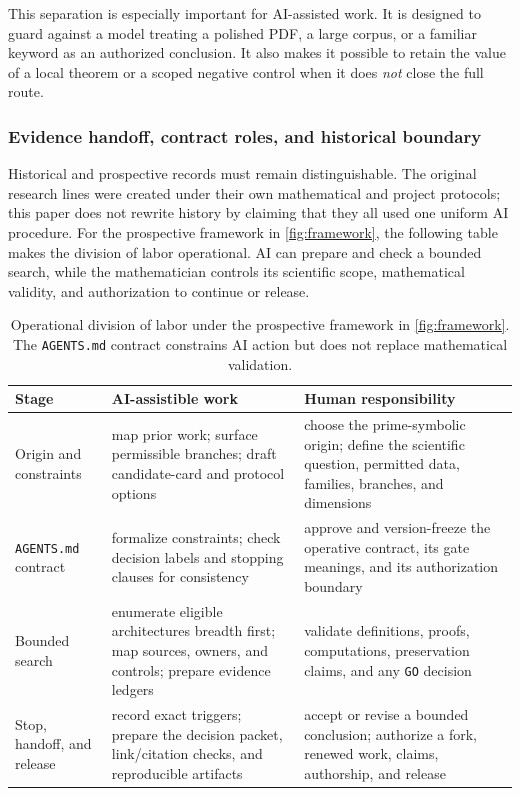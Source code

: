 This separation is especially important for AI-assisted work. It is designed
to guard against a model treating a polished PDF, a large corpus, or a familiar
keyword as an authorized conclusion. It also makes it possible to retain the
value of a local theorem or a scoped negative control when it does \emph{not}
close the full route.


\subsubsection{Evidence handoff, contract roles, and historical boundary}

Historical and prospective records must remain distinguishable. The original
research lines were created under their own mathematical and project protocols;
this paper does not rewrite history by claiming that they all used one uniform
AI procedure. For the prospective framework in \cref{fig:framework}, the
following table makes the division of labor operational. AI can prepare and
check a bounded search, while the mathematician controls its scientific scope,
mathematical validity, and authorization to continue or release.

\begin{table}[H]
\centering
\caption{Operational division of labor under the prospective framework in \cref{fig:framework}. The \texttt{AGENTS.md} contract constrains AI action but does not replace mathematical validation.}
\label{tab:roles}
\small
\begin{tabularx}{\linewidth}{@{}p{.22\linewidth}YY@{}}
\toprule
\textbf{Stage} & \textbf{AI-assistible work} & \textbf{Human responsibility} \\
\midrule
Origin and constraints & map prior work; surface permissible branches; draft
candidate-card and protocol options & choose the prime-symbolic origin; define
the scientific question, permitted data, families, branches, and dimensions \\
\texttt{AGENTS.md} contract & formalize constraints; check decision labels and
stopping clauses for consistency & approve and version-freeze the operative
contract, its gate meanings, and its authorization boundary \\
Bounded search & enumerate eligible architectures breadth first; map sources,
owners, and controls; prepare evidence ledgers & validate definitions, proofs,
computations, preservation claims, and any \texttt{GO} decision \\
Stop, handoff, and release & record exact triggers; prepare the decision packet,
link/citation checks, and reproducible artifacts & accept or revise a bounded
conclusion; authorize a fork, renewed work, claims, authorship, and release \\
\bottomrule
\end{tabularx}
\end{table}


